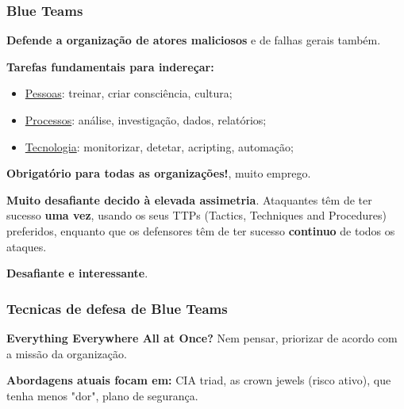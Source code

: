 \documentclass{article}
\begin{document}
\subsubsection{Blue Teams}

\begin{flushleft}
  \textbf{Defende a organização de atores maliciosos} e de falhas gerais também.

  \vspace{2mm}

  \textbf{Tarefas fundamentais para indereçar:}
  \begin{itemize}
    \item \uline{Pessoas}: treinar, criar consciência, cultura;
    \item \uline{Processos}: análise, investigação, dados, relatórios;
    \item \uline{Tecnologia}: monitorizar, detetar, acripting, automação;
  \end{itemize}

  \vspace{2mm}

  \textbf{Obrigatório para todas as organizações!}, muito emprego.

  \vspace{2mm}

  \textbf{Muito desafiante decido à elevada assimetria}. Ataquantes têm
  de ter sucesso \textbf{uma vez}, usando os seus TTPs (Tactics, Techniques and Procedures) preferidos,
  enquanto que os defensores têm de ter sucesso \textbf{continuo} de todos os ataques.

  \vspace{2mm}

  \textbf{Desafiante e interessante}.
\end{flushleft}

\pagebreak

\subsubsection{Tecnicas de defesa de Blue Teams}

\begin{flushleft}
  \textbf{Everything Everywhere All at Once?} Nem pensar, priorizar de acordo
  com a missão da organização.

  \vspace{2mm}

  \textbf{Abordagens atuais focam em:} CIA triad, as crown jewels (risco ativo),
  que tenha menos "dor", plano de segurança.
\end{flushleft}
\end{document}
